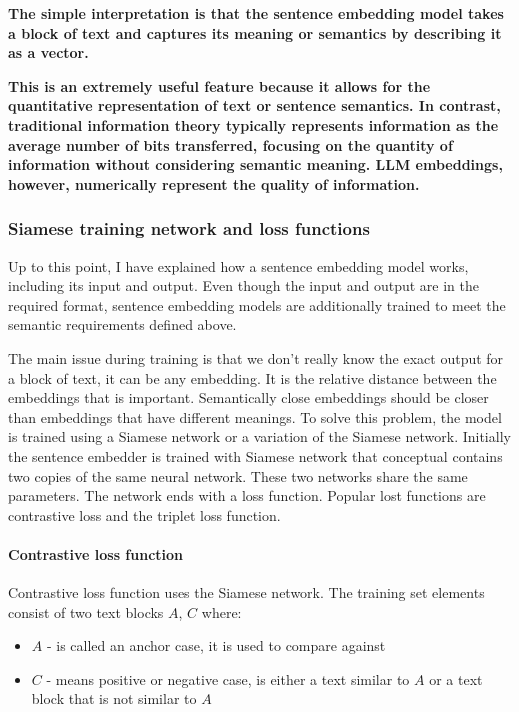 \documentclass{wseas}
\begin{document}
\textbf{The simple interpretation is that the sentence embedding model
takes a block of text and captures its meaning or semantics by
describing it as a vector.}

\textbf{This is an extremely useful feature because it allows for the 
quantitative representation of text or sentence semantics. In contrast, 
traditional information theory typically represents information as the 
average number of bits transferred, focusing on the quantity of information 
without considering semantic meaning. LLM embeddings, however, numerically 
represent the quality of information.}

\subsubsection{Siamese training network and loss functions}

Up to this point, I have explained how a sentence embedding model works,
including its input and output. Even though the input and output are in
the required format, sentence embedding models are additionally trained
to meet the semantic requirements defined above.

The main issue during training is that we don't really know the exact
output for a block of text, it can be any embedding. It is the relative
distance between the embeddings that is important. Semantically close
embeddings should be closer than embeddings that have different
meanings. To solve this problem, the model is trained using a Siamese
network or a variation of the Siamese network. Initially the sentence
embedder is trained with Siamese network that conceptual contains two
copies of the same neural network. These two networks share the same
parameters. The network ends with a loss function. Popular lost
functions are contrastive loss and the triplet loss function.

\paragraph{Contrastive loss function}

Contrastive loss function uses the Siamese network. The training set
elements consist of two text blocks \(A\), \(C\) where:

\begin{itemize}

\item
  \(A\) - is called an anchor case, it is used to compare against
\item
  \(C\) - means positive or negative case, is either a text similar to
  \(A\) or a text block that is not similar to \(A\)
\end{itemize}
\end{document}
